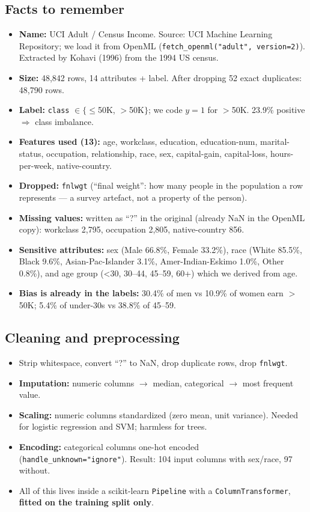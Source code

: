 \documentclass[11pt,a4paper]{article}
\begin{document}
\subsection{Facts to remember}
\begin{itemize}
  \item \textbf{Name:} UCI Adult / Census Income. Source: UCI Machine Learning Repository; we load it from OpenML (\texttt{fetch\_openml("adult", version=2)}). Extracted by Kohavi (1996) from the 1994 US census.
  \item \textbf{Size:} 48,842 rows, 14 attributes + label. After dropping 52 exact duplicates: 48,790 rows.
  \item \textbf{Label:} \texttt{class} $\in\{\leq$50K, $>$50K$\}$; we code $y=1$ for $>$50K. 23.9\% positive $\Rightarrow$ class imbalance.
  \item \textbf{Features used (13):} age, workclass, education, education-num, marital-status, occupation, relationship, race, sex, capital-gain, capital-loss, hours-per-week, native-country.
  \item \textbf{Dropped:} \texttt{fnlwgt} (``final weight'': how many people in the population a row represents --- a survey artefact, not a property of the person).
  \item \textbf{Missing values:} written as ``?'' in the original (already NaN in the OpenML copy): workclass 2,795, occupation 2,805, native-country 856.
  \item \textbf{Sensitive attributes:} sex (Male 66.8\%, Female 33.2\%), race (White 85.5\%, Black 9.6\%, Asian-Pac-Islander 3.1\%, Amer-Indian-Eskimo 1.0\%, Other 0.8\%), and age group (<30, 30--44, 45--59, 60+) which we derived from age.
  \item \textbf{Bias is already in the labels:} 30.4\% of men vs 10.9\% of women earn $>$50K; 5.4\% of under-30s vs 38.8\% of 45--59.
\end{itemize}

\subsection{Cleaning and preprocessing}
\begin{itemize}
  \item Strip whitespace, convert ``?'' to NaN, drop duplicate rows, drop \texttt{fnlwgt}.
  \item \textbf{Imputation:} numeric columns $\to$ median, categorical $\to$ most frequent value.
  \item \textbf{Scaling:} numeric columns standardized (zero mean, unit variance). Needed for logistic regression and SVM; harmless for trees.
  \item \textbf{Encoding:} categorical columns one-hot encoded (\texttt{handle\_unknown="ignore"}). Result: 104 input columns with sex/race, 97 without.
  \item All of this lives inside a scikit-learn \texttt{Pipeline} with a \texttt{ColumnTransformer}, \textbf{fitted on the training split only}.
\end{itemize}
\end{document}

